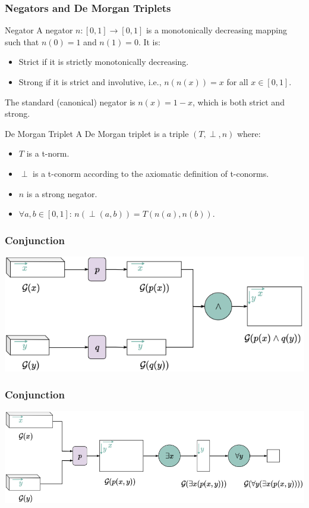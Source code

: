 \documentclass{beamer}
\begin{document}
\begin{frame}
\frametitle{Negators and De Morgan Triplets}
\begin{block}{Negator}
A negator \( n: [0, 1] \to [0, 1] \) is a monotonically decreasing mapping such that \( n(0) = 1 \) and \( n(1) = 0 \). It is:
\begin{itemize}
    \item Strict if it is strictly monotonically decreasing.
    \item Strong if it is strict and involutive, i.e., \( n(n(x)) = x \) for all \( x \in [0, 1] \).
\end{itemize}
The standard (canonical) negator is \( n(x) = 1 - x \), which is both strict and strong.
\end{block}

\begin{block}{De Morgan Triplet}
A De Morgan triplet is a triple \( (T, \perp, n) \) where:
\begin{itemize}
    \item \( T \) is a t-norm.
    \item \( \perp \) is a t-conorm according to the axiomatic definition of t-conorms.
    \item \( n \) is a strong negator.
    \item \( \forall a, b \in [0, 1] \): \( n(\perp(a, b)) = T(n(a), n(b)) \).
\end{itemize}
\end{block}
\end{frame}

\begin{frame}
  \frametitle{Conjunction}
  \includegraphics[width=\textwidth]{ltn2.png}
\end{frame}

\begin{frame}
  \frametitle{Conjunction}
  \includegraphics[width=\textwidth]{ltn3.png}
\end{frame}
\end{document}
